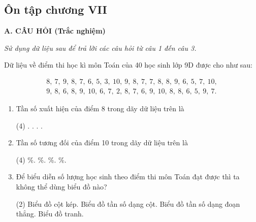 \begin{practice}
    \subsection{Ôn tập chương VII}

    \textbf{A. CÂU HỎI (Trắc nghiệm)}

    \textit{Sử dụng dữ liệu sau để trả lời các câu hỏi từ câu 1 đến câu 3.}

    Dữ liệu về điểm thi học kì môn Toán của 40 học sinh lớp 9D được cho như sau:

    \[
    \begin{gathered}
        8,\ 7,\ 9,\ 8,\ 7,\ 6,\ 5,\ 3,\ 10,\ 9,\ 8,\ 7,\ 7,\ 8,\ 8,\ 9,\ 6,\ 5,\ 7,\ 10,\\
        9,\ 8,\ 6,\ 8,\ 9,\ 10,\ 6,\ 7,\ 2,\ 8,\ 7,\ 6,\ 9,\ 10,\ 8,\ 8,\ 6,\ 5,\ 9,\ 7.
    \end{gathered}
    \]

    \begin{enumerate}[label=\arabic*.]
        \item Tần số xuất hiện của điểm 8 trong dãy dữ liệu trên là
        \begin{tasks}(4)
            .
            .
            .
            .
        \end{tasks}
        \par\noindent\answerbox\par

        \item Tần số tương đối của điểm 10 trong dãy dữ liệu trên là
        \begin{tasks}(4)
            \%.
            \%.
            \%.
            \%.
        \end{tasks}
        \par\noindent\answerbox\par

        \item Để biểu diễn số lượng học sinh theo điểm thi môn Toán đạt được thì ta không thể dùng biểu đồ nào?
        \begin{tasks}(2)
            \task Biểu đồ cột kép.
            \task Biểu đồ tần số dạng cột.
            \task Biểu đồ tần số dạng đoạn thẳng.
            \task Biểu đồ tranh.
        \end{tasks}
        \par\noindent\answerbox\par
    \end{enumerate}


\end{practice}
